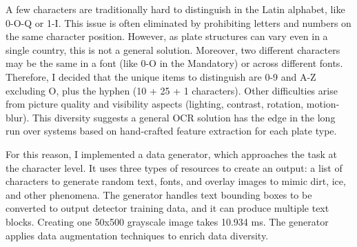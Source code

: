 A few characters are traditionally hard to distinguish in the Latin alphabet, like 0-O-Q or 1-I. This issue is often eliminated by prohibiting letters and numbers on the same character position. However, as plate structures can vary even in a single country, this is not a general solution. Moreover, two different characters may be the same in a font (like 0-O in the Mandatory) or across different fonts. Therefore, I decided that the unique items to distinguish are 0-9 and A-Z excluding O, plus the hyphen (10 + 25 + 1 characters). Other difficulties arise from picture quality and visibility aspects (lighting, contrast, rotation, motion-blur). This diversity suggests a general OCR solution has the edge in the long run over systems based on hand-crafted feature extraction for each plate type.

For this reason, I implemented a data generator, which approaches the task at the character level. It uses three types of resources to create an output: a list of characters to generate random text, fonts, and overlay images to mimic dirt, ice, and other phenomena. The generator handles text bounding boxes to be converted to output detector training data, and it can produce multiple text blocks. Creating one 50x500 grayscale image takes 10.934 ms. The generator applies data augmentation techniques to enrich data diversity.

